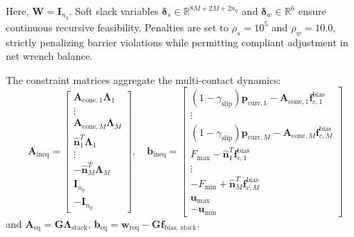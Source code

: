 Here, $\mathbf{W} = \mathbf{I}_{n_q}$. Soft slack variables $\boldsymbol{\delta}_s \in \mathbb{R}^{8M + 2M + 2n_q}$ and $\boldsymbol{\delta}_w \in \mathbb{R}^6$ ensure continuous recursive feasibility. Penalties are set to $\rho_s = 10^5$ and $\rho_w = 10.0$, strictly penalizing barrier violations while permitting compliant adjustment in net wrench balance.

The constraint matrices aggregate the multi-contact dynamics:
\begin{equation}
    \mathbf{A}_{\text{ineq}} = \begin{bmatrix}
        \mathbf{A}_{\text{cone}, 1} \mathbf{\Lambda}_1 \\
        \vdots \\
        \mathbf{A}_{\text{cone}, M} \mathbf{\Lambda}_M \\
        \hat{\mathbf{n}}_1^T \mathbf{\Lambda}_1 \\
        \vdots \\
        -\hat{\mathbf{n}}_M^T \mathbf{\Lambda}_M \\
        \mathbf{I}_{n_q} \\
        -\mathbf{I}_{n_q}
    \end{bmatrix}, \quad
    \mathbf{b}_{\text{ineq}} = \begin{bmatrix}
        (1 - \gamma_{\text{slip}}) \mathbf{p}_{\text{curr}, 1} - \mathbf{A}_{\text{cone}, 1} \mathbf{f}_{c, 1}^{\text{bias}} \\
        \vdots \\
        (1 - \gamma_{\text{slip}}) \mathbf{p}_{\text{curr}, M} - \mathbf{A}_{\text{cone}, M} \mathbf{f}_{c, M}^{\text{bias}} \\
        F_{\max} - \hat{\mathbf{n}}_1^T \mathbf{f}_{c, 1}^{\text{bias}} \\
        \vdots \\
        -F_{\min} + \hat{\mathbf{n}}_M^T \mathbf{f}_{c, M}^{\text{bias}} \\
        \mathbf{u}_{\max} \\
        -\mathbf{u}_{\min}
    \end{bmatrix}
\end{equation}
and $\mathbf{A}_{\text{eq}} = \mathbf{G} \mathbf{\Lambda}_{\text{stack}}$, $\mathbf{b}_{\text{eq}} = \mathbf{w}_{\text{req}} - \mathbf{G} \mathbf{f}_{\text{bias, stack}}$.

